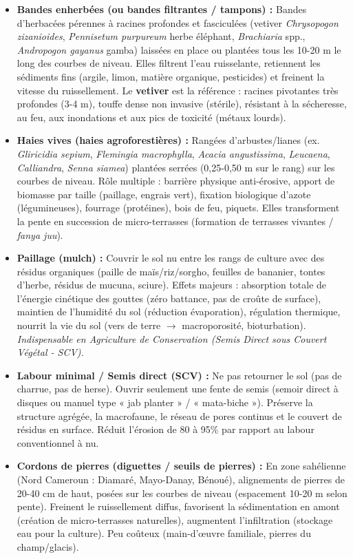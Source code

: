 \documentclass[11pt]{article}
\begin{document}
\begin{itemize}
    \item \textbf{Bandes enherbées (ou bandes filtrantes / tampons) :} Bandes d'herbacées pérennes à racines profondes et fasciculées (vetiver \emph{Chrysopogon zizanioides}, \emph{Pennisetum purpureum} herbe éléphant, \emph{Brachiaria} spp., \emph{Andropogon gayanus} gamba) laissées en place ou plantées tous les 10-20 m le long des courbes de niveau. Elles filtrent l'eau ruisselante, retiennent les sédiments fins (argile, limon, matière organique, pesticides) et freinent la vitesse du ruissellement. Le \textbf{vetiver} est la référence : racines pivotantes très profondes (3-4 m), touffe dense non invasive (stérile), résistant à la sécheresse, au feu, aux inondations et aux pics de toxicité (métaux lourds).
    \item \textbf{Haies vives (haies agroforestières) :} Rangées d'arbustes/lianes (ex. \emph{Gliricidia sepium}, \emph{Flemingia macrophylla}, \emph{Acacia angustissima}, \emph{Leucaena}, \emph{Calliandra}, \emph{Senna siamea}) plantées serrées (0,25-0,50 m sur le rang) sur les courbes de niveau. Rôle multiple : barrière physique anti-érosive, apport de biomasse par taille (paillage, engrais vert), fixation biologique d'azote (légumineuses), fourrage (protéines), bois de feu, piquets. Elles transforment la pente en succession de micro-terrasses (formation de terrasses vivantes / \textit{fanya juu}).
    \item \textbf{Paillage (mulch) :} Couvrir le sol nu entre les rangs de culture avec des résidus organiques (paille de maïs/riz/sorgho, feuilles de bananier, tontes d'herbe, résidus de mucuna, sciure). Effets majeurs : absorption totale de l'énergie cinétique des gouttes (zéro battance, pas de croûte de surface), maintien de l'humidité du sol (réduction évaporation), régulation thermique, nourrit la vie du sol (vers de terre $\rightarrow$ macroporosité, bioturbation). \emph{Indispensable en Agriculture de Conservation (Semis Direct sous Couvert Végétal - SCV).}
    \item \textbf{Labour minimal / Semis direct (SCV) :} Ne pas retourner le sol (pas de charrue, pas de herse). Ouvrir seulement une fente de semis (semoir direct à disques ou manuel type « jab planter » / « mata-biche »). Préserve la structure agrégée, la macrofaune, le réseau de pores continus et le couvert de résidus en surface. Réduit l'érosion de 80 à 95\% par rapport au labour conventionnel à nu.
    \item \textbf{Cordons de pierres (diguettes / seuils de pierres) :} En zone sahélienne (Nord Cameroun : Diamaré, Mayo-Danay, Bénoué), alignements de pierres de 20-40 cm de haut, posées sur les courbes de niveau (espacement 10-20 m selon pente). Freinent le ruissellement diffus, favorisent la sédimentation en amont (création de micro-terrasses naturelles), augmentent l'infiltration (stockage eau pour la culture). Peu coûteux (main-d'œuvre familiale, pierres du champ/glacis).

\end{itemize}
\end{document}
